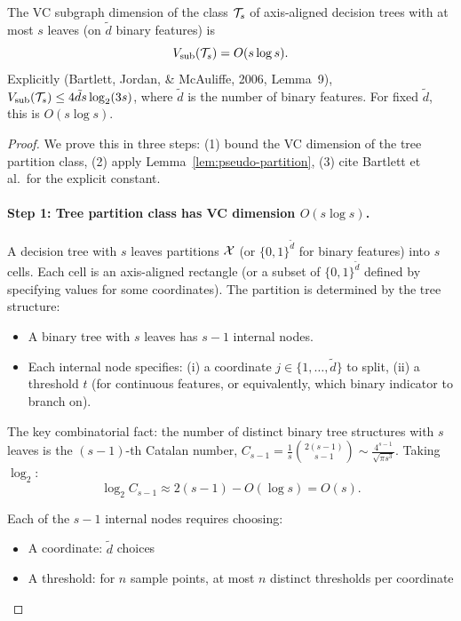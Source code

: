 \documentclass[12pt]{article}
\begin{document}
\begin{theorem}
\label{thm:vc-trees-app}
The VC subgraph dimension of the class $\mathcal{T}_s$ of axis-aligned decision trees with at most $s$ leaves (on $\tilde{d}$ binary features) is
\[
V_{\text{sub}}(\mathcal{T}_s) = O(s \log s).
\]
Explicitly (Bartlett, Jordan, \& McAuliffe, 2006, Lemma~9), $V_{\text{sub}}(\mathcal{T}_s) \le 4\tilde{d}s \log_2(3s)$, where $\tilde{d}$ is the number of binary features. For fixed $\tilde{d}$, this is $O(s \log s)$.
\end{theorem}

\begin{proof}
We prove this in three steps: (1) bound the VC dimension of the tree partition class, (2) apply Lemma~\ref{lem:pseudo-partition}, (3) cite Bartlett et al.\ for the explicit constant.

\paragraph{Step 1: Tree partition class has VC dimension $O(s \log s)$.}
A decision tree with $s$ leaves partitions $\mathcal{X}$ (or $\{0,1\}^{\tilde{d}}$ for binary features) into $s$ cells. Each cell is an axis-aligned rectangle (or a subset of $\{0,1\}^{\tilde{d}}$ defined by specifying values for some coordinates). The partition is determined by the tree structure:
\begin{itemize}
\item A binary tree with $s$ leaves has $s-1$ internal nodes.
\item Each internal node specifies: (i) a coordinate $j \in \{1,\ldots,\tilde{d}\}$ to split, (ii) a threshold $t$ (for continuous features, or equivalently, which binary indicator to branch on).
\end{itemize}

The key combinatorial fact: the number of distinct binary tree structures with $s$ leaves is the $(s-1)$-th Catalan number, $C_{s-1} = \frac{1}{s}\binom{2(s-1)}{s-1} \sim \frac{4^{s-1}}{\sqrt{\pi s^3}}$. Taking $\log_2$:
\[
\log_2 C_{s-1} \approx 2(s-1) - O(\log s) = O(s).
\]

Each of the $s-1$ internal nodes requires choosing:
\begin{itemize}
\item A coordinate: $\tilde{d}$ choices
\item A threshold: for $n$ sample points, at most $n$ distinct thresholds per coordinate
\end{itemize}


\end{proof}
\end{document}
